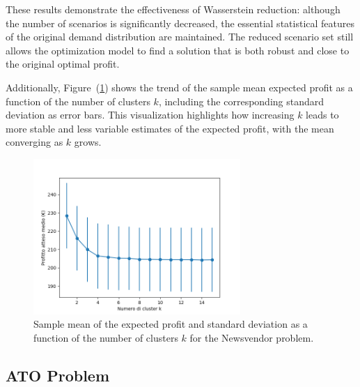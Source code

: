 \documentclass[a4paper,12pt]{article}
\begin{document}
	\noindent These results demonstrate the effectiveness of Wasserstein reduction: although the number of scenarios is significantly decreased, the essential statistical features of the original demand distribution are maintained. The reduced scenario set still allows the optimization model to find a solution that is both robust and close to the original optimal profit.
	
	\noindent
	Additionally, Figure~(\ref{fig:rendimentoWass-nv}) shows the trend of the sample mean expected profit as a function of the number of clusters $k$, including the corresponding standard deviation as error bars. This visualization highlights how increasing $k$ leads to more stable and less variable estimates of the expected profit, with the mean converging as $k$ grows.
	
	\begin{figure}[H]
		\centering
		\includegraphics[width=0.7\textwidth]{../immagini/rendimentoWass_nv.png}
		\caption{Sample mean of the expected profit and standard deviation as a function of the number of clusters $k$ for the Newsvendor problem.}
		\label{fig:rendimentoWass-nv}
	\end{figure}	
	
	\subsection{ATO Problem}
	
\end{document}
